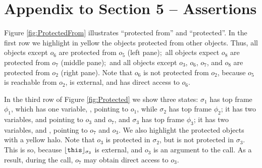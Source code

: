 \section{Appendix to Section 5 -- Assertions}
\label{appendix:assertions}

Figure \ref{fig:ProtectedFrom} illustrates ``protected from'' and ``protected''. %
In the first row  we  highlight in yellow  the objects protected from other objects. Thus, all objects except $o_6$ are protected from $o_5$ (left pane);\ all objects expect $o_8$ are protected from $o_7$ (middle pane);\ and all objects except $o_3$, $o_6$, $o_7$, and $o_8$ are protected from $o_2$ (right pane). 
Note  that $o_6$ is not protected from $o_2$, because  $o_5$ is reachable from $o_2$, is external, and has direct access to $o_6$.

In the third row of   Figure \ref{fig:Protected} we show three states: 
 $\sigma_1$ has  top frame $\phi_1$, which has  one variable, , pointing to $o_1$, while 
 $\sigma_2$ has  top frame $\phi_2$; it has two  variables,    and  pointing to $o_3$ and  $o_7$, and 
 $\sigma_3$ has  top frame $\phi_3$; it has two  variables,   and , pointing to $o_7$ and $o_3$.  
% 
We also   highlight the protected objects with a yellow halo.
 Note that $o_3$ is protected in $\sigma_2$, but is not protected in $\sigma_3$. This is so, because $\interpret {\sigma_3} {\prg{this}}$  is external, and  $o_3$ is an argument to the call. As a result, during the call, $o_7$ may obtain direct access to $o_3$. 
 
